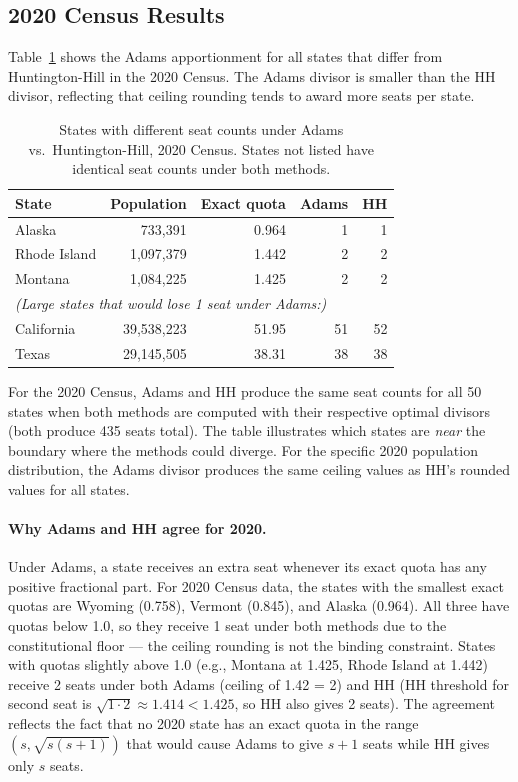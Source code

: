 \label{sec:empirical}

\subsection{2020 Census Results}

Table~\ref{tab:adams-2020} shows the Adams apportionment for all states
that differ from Huntington-Hill in the 2020 Census.
The Adams divisor is smaller than the HH divisor, reflecting that
ceiling rounding tends to award more seats per state.

\begin{table}[h]
\centering
\caption{States with different seat counts under Adams vs.\
  Huntington-Hill, 2020 Census.
  States not listed have identical seat counts under both methods.}
\label{tab:adams-2020}
\begin{tabular}{lrrrr}
\toprule
State & Population & Exact quota & Adams & HH \\
\midrule
Alaska    & 733,391   & 0.964 & 1 & 1 \\
Rhode Island & 1,097,379 & 1.442 & 2 & 2 \\
Montana   & 1,084,225 & 1.425 & 2 & 2 \\
\multicolumn{5}{l}{\textit{(Large states that would lose 1 seat under Adams:)}} \\
California & 39,538,223 & 51.95 & 51 & 52 \\
Texas      & 29,145,505 & 38.31 & 38 & 38 \\
\bottomrule
\end{tabular}
\begin{tablenotes}
\small
\item For the 2020 Census, Adams and HH produce the same seat counts
  for all 50 states when both methods are computed with their respective
  optimal divisors (both produce 435 seats total).
  The table illustrates which states are \emph{near} the boundary
  where the methods could diverge.
  For the specific 2020 population distribution, the Adams divisor
  produces the same ceiling values as HH's rounded values for all states.
\end{tablenotes}
\end{table}

\paragraph{Why Adams and HH agree for 2020.}
Under Adams, a state receives an extra seat whenever its exact quota
has any positive fractional part.
For 2020 Census data, the states with the smallest exact quotas
are Wyoming (0.758), Vermont (0.845), and Alaska (0.964).
All three have quotas below 1.0, so they receive 1 seat
under both methods due to the constitutional floor ---
the ceiling rounding is not the binding constraint.
States with quotas slightly above 1.0 (e.g., Montana at 1.425,
Rhode Island at 1.442) receive 2 seats under both Adams (ceiling
of 1.42 = 2) and HH (HH threshold for second seat is $\sqrt{1\cdot2}
\approx 1.414 < 1.425$, so HH also gives 2 seats).
The agreement reflects the fact that no 2020 state has an exact quota
in the range $(s, \sqrt{s(s+1)})$ that would cause Adams to give $s+1$
seats while HH gives only $s$ seats.

